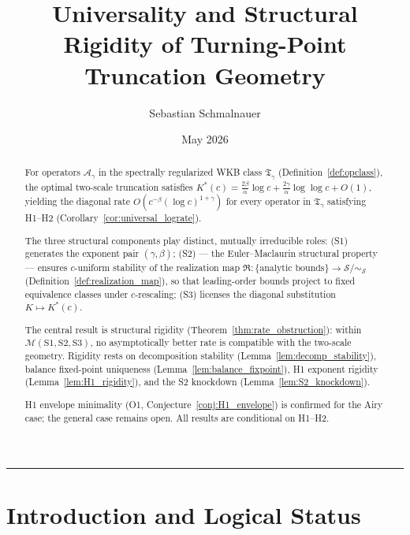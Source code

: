 \documentclass[12pt,a4paper]{amsart}
\theoremstyle{definition}
\newcommand{\cAg}{\mathcal{A}_\gamma}
\begin{document}
\title{Universality and Structural Rigidity of
  Turning-Point Truncation Geometry}

\author{Sebastian Schmalnauer}
\address{Vienna, Austria}
\date{May 2026}

\begin{abstract}
For operators $\cAg$ in the spectrally regularized WKB class
$\mathfrak{T}_\gamma$ (Definition~\ref{def:opclass}),
the optimal two-scale truncation satisfies
$K^*(c) = \frac{2\beta}{\alpha}\log c + \frac{2\gamma}{\alpha}\log\log c + O(1)$,
yielding the diagonal rate
$O(c^{-\beta}(\log c)^{1+\gamma})$
for every operator in $\mathfrak{T}_\gamma$ satisfying H1--H2
(Corollary~\ref{cor:universal_lograte}).

The three structural components play distinct, mutually irreducible roles:
(S1) generates the exponent pair $(\gamma,\beta)$;
(S2) --- the Euler--Maclaurin structural property ---
ensures $c$-uniform stability of the realization map
$\mathfrak{R}\colon \{\text{analytic bounds}\} \to \mathcal{S}/\!\sim_{\mathcal{S}}$
(Definition~\ref{def:realization_map}),
so that leading-order bounds project to fixed equivalence classes
under $c$-rescaling;
(S3) licenses the diagonal substitution $K\mapsto K^*(c)$.

The central result is structural rigidity
(Theorem~\ref{thm:rate_obstruction}):
within $\mathcal{M}(\mathrm{S1,S2,S3})$,
no asymptotically better rate is compatible with the two-scale geometry.
Rigidity rests on decomposition stability (Lemma~\ref{lem:decomp_stability}),
balance fixed-point uniqueness (Lemma~\ref{lem:balance_fixpoint}),
H1 exponent rigidity (Lemma~\ref{lem:H1_rigidity}),
and the S2 knockdown (Lemma~\ref{lem:S2_knockdown}).

H1 envelope minimality (O1, Conjecture~\ref{conj:H1_envelope})
is confirmed for the Airy case; the general case remains open.
All results are conditional on H1--H2.
\end{abstract}

\maketitle
\tableofcontents
\bigskip\hrule\bigskip

\section{Introduction and Logical Status}
\label{sec:intro}
\end{document}
